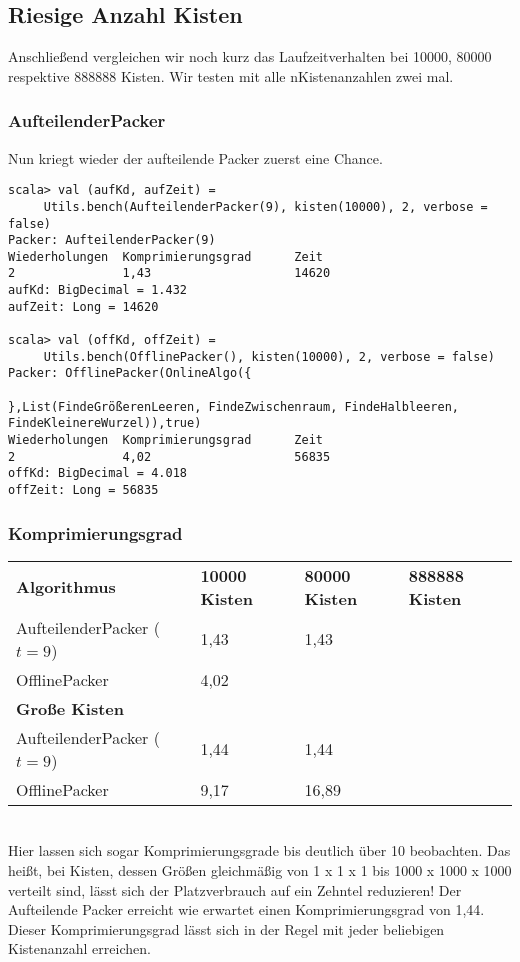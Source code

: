 \subsection{Riesige Anzahl Kisten}
Anschließend vergleichen wir noch kurz das Laufzeitverhalten bei 10000, 80000 respektive 888888 Kisten.
Wir testen mit alle nKistenanzahlen zwei mal.
\subsubsection*{AufteilenderPacker}
Nun kriegt wieder der aufteilende Packer zuerst eine Chance.
\begin{lstlisting}
scala> val (aufKd, aufZeit) =
	 Utils.bench(AufteilenderPacker(9), kisten(10000), 2, verbose = false) 
Packer: AufteilenderPacker(9)
Wiederholungen  Komprimierungsgrad      Zeit
2               1,43                    14620
aufKd: BigDecimal = 1.432
aufZeit: Long = 14620

scala> val (offKd, offZeit) =
	 Utils.bench(OfflinePacker(), kisten(10000), 2, verbose = false) 
Packer: OfflinePacker(OnlineAlgo({

},List(FindeGrößerenLeeren, FindeZwischenraum, FindeHalbleeren, FindeKleinereWurzel)),true)
Wiederholungen  Komprimierungsgrad      Zeit
2               4,02                    56835
offKd: BigDecimal = 4.018
offZeit: Long = 56835
\end{lstlisting}

\subsubsection*{Komprimierungsgrad}
\begin{tabular}{llll}
\textbf{Algorithmus} 	& \textbf{10000 Kisten} & \textbf{80000 Kisten} & \textbf{888888 Kisten} \\
 AufteilenderPacker ($t=9$)  	& 1,43		& 1,43			& 			 \\
 OfflinePacker			& 4,02		& 			& 		\vspace*{.48em} \\
\textbf{Große Kisten} & & & \\
 AufteilenderPacker ($t=9$)  	& 1,44		& 1,44			& 			\\
 OfflinePacker			& 9,17		& 16,89			& 			\\
\end{tabular} \\

 Hier lassen sich sogar Komprimierungsgrade bis deutlich über 10 beobachten.
 Das heißt, bei Kisten, dessen Größen gleichmäßig von 1 x 1 x 1 bis 1000 x 1000 x 1000 verteilt sind,
  lässt sich der Platzverbrauch auf ein Zehntel reduzieren!
 Der Aufteilende Packer erreicht wie erwartet einen Komprimierungsgrad von 1,44.
 Dieser Komprimierungsgrad lässt sich in der Regel mit jeder beliebigen Kistenanzahl erreichen.
 

